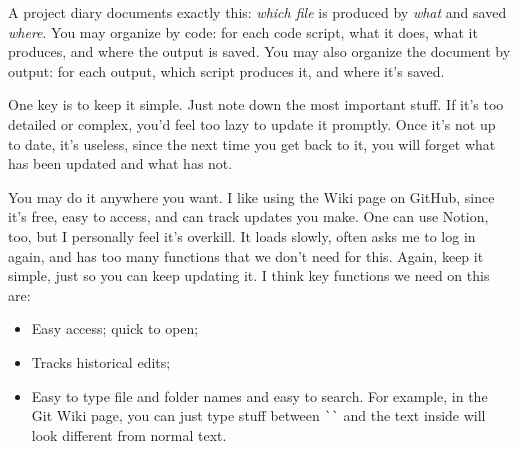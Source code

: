 A project diary documents exactly this: \textit{which file} is produced by \textit{what} and saved \textit{where}. You may organize by code: for each code script, what it does, what it produces, and where the output is saved. You may also organize the document by output: for each output, which script produces it, and where it's saved.

One key is to keep it simple. Just note down the most important stuff. If it's too detailed or complex, you'd feel too lazy to update it promptly. Once it's not up to date, it's useless, since the next time you get back to it, you will forget what has been updated and what has not. 

You may do it anywhere you want. I like using the Wiki page on GitHub, since it's free, easy to access, and can track updates you make. One can use Notion, too, but I personally feel it's overkill. It loads slowly, often asks me to log in again, and has too many functions that we don't need for this. Again, keep it simple, just so you can keep updating it. I think key functions we need on this are:
\begin{itemize}
    \item Easy access; quick to open;
    \item Tracks historical edits;
    \item Easy to type file and folder names and easy to search. For example, in the Git Wiki page, you can just type stuff between \verb|``| and the text inside will look different from normal text.
\end{itemize}

